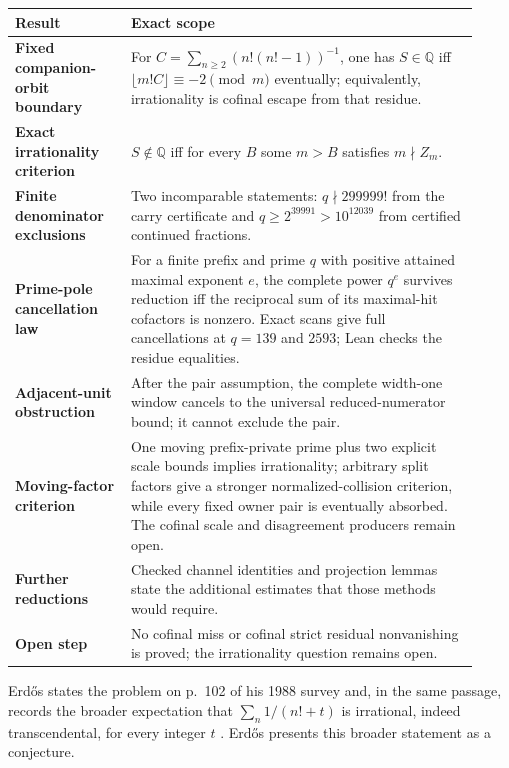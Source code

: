 \documentclass[11pt]{article}
\newcommand{\Ser}{S}
\begin{document}
\begin{center}
\small
\begin{tabular}{@{}
  >{\raggedright\arraybackslash}p{0.23\linewidth}
  >{\raggedright\arraybackslash}p{0.69\linewidth}@{}}
\toprule
Result & Exact scope \\
\midrule
\textbf{Fixed companion-orbit boundary} & For $C=\sum_{n\ge2}(n!(n!-1))^{-1}$, one has $\Ser\in\mathbb Q$ iff $\lfloor m!C\rfloor\equiv-2\pmod m$ eventually; equivalently, irrationality is cofinal escape from that residue. \\
\textbf{Exact irrationality criterion} & $\Ser\notin\mathbb Q$ iff for every $B$ some $m>B$ satisfies $m\nmid Z_m$. \\
\textbf{Finite denominator exclusions} & Two incomparable statements: $q\nmid299999!$ from the carry certificate and $q\ge2^{39991}>10^{12039}$ from certified continued fractions. \\
\textbf{Prime-pole cancellation law} & For a finite prefix and prime $q$ with positive attained maximal exponent $e$, the complete power $q^e$ survives reduction iff the reciprocal sum of its maximal-hit cofactors is nonzero.  Exact scans give full cancellations at $q=139$ and $2593$; Lean checks the residue equalities. \\
\textbf{Adjacent-unit obstruction} & After the pair assumption, the complete width-one window cancels to the universal reduced-numerator bound; it cannot exclude the pair. \\
\textbf{Moving-factor criterion} & One moving prefix-private prime plus two explicit scale bounds implies irrationality; arbitrary split factors give a stronger normalized-collision criterion, while every fixed owner pair is eventually absorbed.  The cofinal scale and disagreement producers remain open. \\
\textbf{Further reductions} & Checked channel identities and projection lemmas state the additional estimates that those methods would require. \\
\textbf{Open step} & No cofinal miss or cofinal strict residual nonvanishing is proved; the irrationality question remains open. \\
\bottomrule
\end{tabular}
\end{center}

\noindent Erd\H{o}s states the problem on p.~102 of his 1988 survey and, in
the same passage, records the broader expectation that
$\sum_n1/(n!+t)$ is irrational, indeed transcendental, for every integer
$t$ \cite[p.~102]{erdos1988}.  Erd\H{o}s presents this broader statement as a
conjecture.
\end{document}
